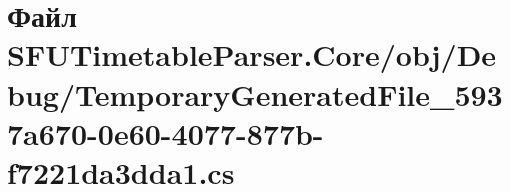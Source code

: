\hypertarget{_s_f_u_timetable_parser_8_core_2obj_2_debug_2_temporary_generated_file__5937a670-0e60-4077-877b-f7221da3dda1_8cs}{}\section{Файл S\+F\+U\+Timetable\+Parser.\+Core/obj/\+Debug/\+Temporary\+Generated\+File\+\_\+5937a670-\/0e60-\/4077-\/877b-\/f7221da3dda1.cs}
\label{_s_f_u_timetable_parser_8_core_2obj_2_debug_2_temporary_generated_file__5937a670-0e60-4077-877b-f7221da3dda1_8cs}
